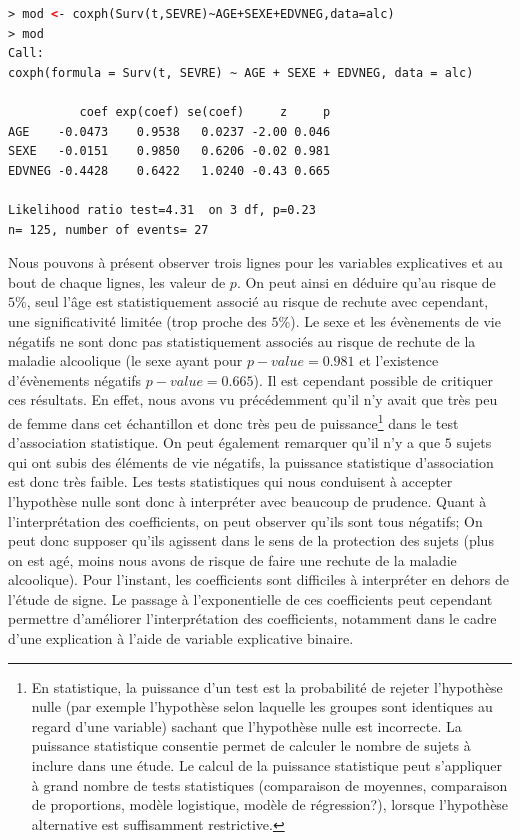 \begin{lstlisting}[language=html]
> mod <- coxph(Surv(t,SEVRE)~AGE+SEXE+EDVNEG,data=alc)
> mod
Call:
coxph(formula = Surv(t, SEVRE) ~ AGE + SEXE + EDVNEG, data = alc)

          coef exp(coef) se(coef)     z     p
AGE    -0.0473    0.9538   0.0237 -2.00 0.046
SEXE   -0.0151    0.9850   0.6206 -0.02 0.981
EDVNEG -0.4428    0.6422   1.0240 -0.43 0.665

Likelihood ratio test=4.31  on 3 df, p=0.23
n= 125, number of events= 27 
\end{lstlisting}

Nous pouvons à présent observer trois lignes pour les variables explicatives et au bout de chaque lignes, les valeur de $p$. On peut ainsi en déduire qu'au risque de $5\%$, seul l'âge est statistiquement associé au risque de rechute avec cependant, une significativité limitée (trop proche des $5\%$).\newline
Le sexe et les évènements de vie négatifs ne sont donc pas statistiquement associés au risque de rechute de la maladie alcoolique (le sexe ayant pour $p-value = 0.981$ et l'existence d'évènements négatifs $p-value = 0.665$).\newline
Il est cependant possible de critiquer ces résultats. En effet, nous avons vu précédemment qu'il n'y avait que très peu de femme dans cet échantillon et donc très peu de puissance\footnote{En statistique, la puissance d'un test est la probabilité de rejeter l'hypothèse nulle (par exemple l'hypothèse selon laquelle les groupes sont identiques au regard d'une variable) sachant que l'hypothèse nulle est incorrecte. La puissance statistique consentie permet de calculer le nombre de sujets à inclure dans une étude. Le calcul de la puissance statistique peut s'appliquer à grand nombre de tests statistiques (comparaison de moyennes, comparaison de proportions, modèle logistique, modèle de régression?), lorsque l'hypothèse alternative est suffisamment restrictive.} dans le test d'association statistique. On peut également remarquer qu'il n'y a que $5$ sujets qui ont subis des éléments de vie négatifs, la puissance statistique d'association est donc très faible.\newline
Les tests statistiques qui nous conduisent à accepter l'hypothèse nulle sont donc à interpréter avec beaucoup de prudence. \newline
Quant à l'interprétation des coefficients, on peut observer qu'ils sont tous négatifs; On peut donc supposer qu'ils agissent dans le sens de la protection des sujets (plus on est agé, moins nous avons de risque de faire une rechute de la maladie alcoolique).\newline
Pour l'instant, les coefficients sont difficiles à interpréter en dehors de l'étude de signe. Le passage à l'exponentielle de ces coefficients peut cependant permettre d'améliorer l'interprétation des coefficients, notamment dans le cadre d'une explication à l'aide de variable explicative binaire.\newline

